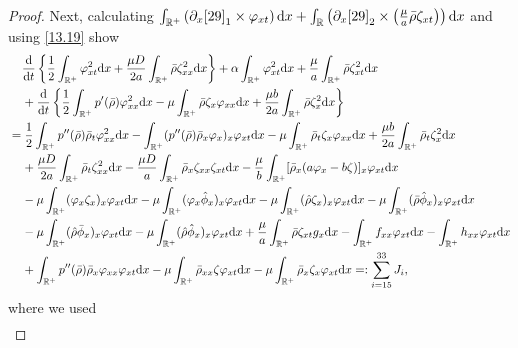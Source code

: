 \documentclass[11pt]{article}
\theoremstyle{plain}
\numberwithin{equation}{section}
\begin{document}
\begin{proof}
Next, calculating $\int_{\mathbb{R}^+}\left(\partial_x\eqref{29}_1\times\varphi_{xt}\right){\rm d}x+\int_{\mathbb{R}}\left(\partial_x\eqref{29}_2\times\left(\frac{\mu}{a}\bar\rho\zeta_{xt}\right)\right){\rm d}x$ and using \eqref{13.19} show
		\begin{align}\label{13.55}
			&\;\;\;\;\frac{{\rm d}}{{\rm d}t}\left\{\frac{1}{2}\int_{\mathbb{R}^+}\varphi_{xt}^2{\rm d}x	+\frac{\mu D}{2a}\int_{\mathbb{R}^+}^{}\bar\rho\zeta_{xx}^2{\rm d}x\right\}+\alpha\int_{\mathbb{R}^+}\varphi_{xt}^2{\rm d}x+\frac{\mu}{a}\int_{\mathbb{R}^+}^{}\bar\rho\zeta_{xt}^2{\rm d}x\notag\\
			&\;\;\;\;+\frac{{\rm d}}{{\rm d}t}\left\{\frac{1}{2}\int_{\mathbb{R}^+}p^{\prime}(\bar\rho)\varphi_{xx}^2{\rm d}x-\mu\int_{\mathbb{R}^+}\bar\rho\zeta_x \varphi_{xx}{\rm d}x+\frac{\mu b}{2a}\int_{\mathbb{R}^+}^{}\bar\rho\zeta_x^2{\rm d}x\right\}\notag\\
			&=\frac{1}{2}\int_{\mathbb{R}^+}p^{\prime\prime}(\bar\rho)\bar\rho_t\varphi_{xx}^2{\rm d}x-\int_{\mathbb{R}^+}(p^{\prime\prime}(\bar\rho)\bar\rho_x\varphi_x)_x\varphi_{xt}{\rm d}x-\mu\int_{\mathbb{R}^+}\bar\rho_t\zeta_x \varphi_{xx}{\rm d}x+\frac{\mu b}{2a}\int_{\mathbb{R}^+}^{}\bar\rho_t\zeta_x^2{\rm d}x	\notag\\
			&\;\;\;\;+\frac{\mu D}{2a}\int_{\mathbb{R}^+}^{}\bar\rho_t\zeta_{xx}^2{\rm d}x
			-\frac{\mu D}{a}\int_{\mathbb{R}^+}^{}\bar\rho_x\zeta_{xx}\zeta_{xt} {\rm d}x-\frac{\mu}{b}\int_{\mathbb{R}^+}[\bar\rho_x(a\varphi_x-b\zeta)]_x\varphi_{xt}{\rm d}x\notag\\
			&\;\;\;\;	-\mu\int_{\mathbb{R}^+}(\varphi_x\zeta_x)_x\varphi_{xt}{\rm d}x-\mu\int_{\mathbb{R}^+}(\varphi_x\hat\phi_x)_x\varphi_{xt}{\rm d}x-\mu\int_{\mathbb{R}^+}(\hat\rho\zeta_x)_x\varphi_{xt}{\rm d}x-\mu\int_{\mathbb{R}^+}(\bar\rho\hat\phi_x)_x\varphi_{xt}{\rm d}x\notag\\
			&\;\;\;\;-\mu\int_{\mathbb{R}^+}(\hat\rho\bar\phi_x)_x\varphi_{xt}{\rm d}x-\mu\int_{\mathbb{R}^+}(\hat\rho\hat\phi_x)_x\varphi_{xt}{\rm d}x+\frac{\mu}{a}\int_{\mathbb{R}^+}^{}\bar\rho\zeta_{xt}g_x {\rm d}x-\int_{\mathbb{R}^+}f_{xx}\varphi_{xt}{\rm d}x-\int_{\mathbb{R}^+}h_{xx}\varphi_{xt}{\rm d}x\notag\\
			&\;\;\;\;+\int_{\mathbb{R}^+}p^{\prime\prime}(\bar\rho)\bar\rho_x\varphi_{xx}\varphi_{xt}{\rm d}x-\mu\int_{\mathbb{R}^+}\bar\rho_{xx}\zeta \varphi_{xt}{\rm d}x-\mu\int_{\mathbb{R}^+}\bar\rho_x\zeta_x\varphi_{xt}{\rm d}x=:\sum_{i=15}^{33}J_i,
		\end{align}
		where we used 
		\begin{align}

\end{align}
\end{proof}
\end{document}

